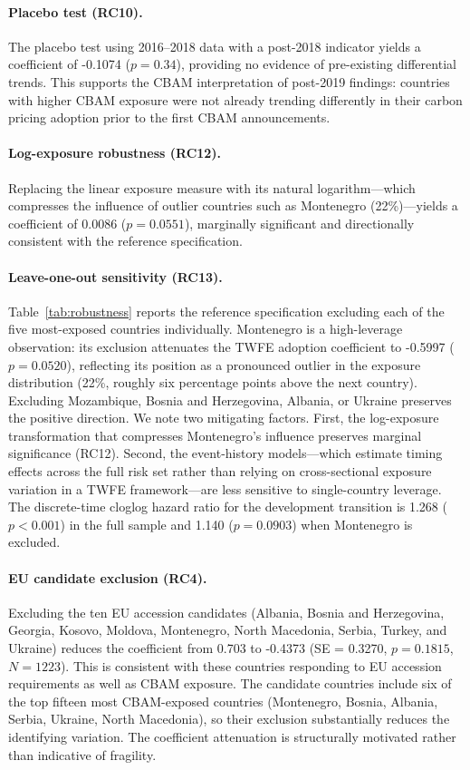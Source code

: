 \documentclass[12pt,a4paper]{article}
\begin{document}
\paragraph{Placebo test (RC10).} The placebo test using 2016--2018 data with a post-2018 indicator yields a coefficient of -0.1074 ($p = 0.34$), providing no evidence of pre-existing differential trends. This supports the CBAM interpretation of post-2019 findings: countries with higher CBAM exposure were not already trending differently in their carbon pricing adoption prior to the first CBAM announcements.

\paragraph{Log-exposure robustness (RC12).} Replacing the linear exposure measure with its natural logarithm---which compresses the influence of outlier countries such as Montenegro (22\%)---yields a coefficient of 0.0086 ($p = 0.0551$), marginally significant and directionally consistent with the reference specification.

\paragraph{Leave-one-out sensitivity (RC13).} Table~\ref{tab:robustness} reports the reference specification excluding each of the five most-exposed countries individually. Montenegro is a high-leverage observation: its exclusion attenuates the TWFE adoption coefficient to -0.5997 ($p = 0.0520$), reflecting its position as a pronounced outlier in the exposure distribution (22\%, roughly six percentage points above the next country). Excluding Mozambique, Bosnia and Herzegovina, Albania, or Ukraine preserves the positive direction. We note two mitigating factors. First, the log-exposure transformation that compresses Montenegro's influence preserves marginal significance (RC12). Second, the event-history models---which estimate timing effects across the full risk set rather than relying on cross-sectional exposure variation in a TWFE framework---are less sensitive to single-country leverage. The discrete-time cloglog hazard ratio for the development transition is 1.268 ($p < 0.001$) in the full sample and 1.140 ($p = 0.0903$) when Montenegro is excluded.

\paragraph{EU candidate exclusion (RC4).} Excluding the ten EU accession candidates (Albania, Bosnia and Herzegovina, Georgia, Kosovo, Moldova, Montenegro, North Macedonia, Serbia, Turkey, and Ukraine) reduces the coefficient from 0.703 to -0.4373 (SE = 0.3270, $p = 0.1815$, $N = 1223$). This is consistent with these countries responding to EU accession requirements as well as CBAM exposure. The candidate countries include six of the top fifteen most CBAM-exposed countries (Montenegro, Bosnia, Albania, Serbia, Ukraine, North Macedonia), so their exclusion substantially reduces the identifying variation. The coefficient attenuation is structurally motivated rather than indicative of fragility.
\end{document}

